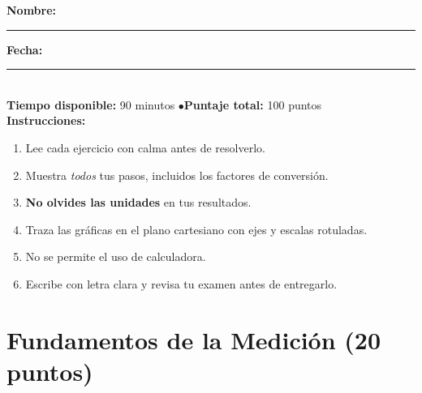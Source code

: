 \documentclass[12pt, letterpaper]{article}
\begin{document}


\vspace{4pt}
\begin{cuadroinfo}
  \small
  \textbf{Nombre:} \rule{0.55\linewidth}{0.4pt} \quad \textbf{Fecha:} \rule{0.15\linewidth}{0.4pt} \\[6pt]
  \textbf{Tiempo disponible:} 90 minutos \quad$\bullet$\quad \textbf{Puntaje total:} 100 puntos \\[4pt]
  \textbf{Instrucciones:}
  \begin{enumerate}[leftmargin=*]
    \item Lee cada ejercicio con calma antes de resolverlo.
    \item Muestra \emph{todos} tus pasos, incluidos los factores de conversión.
    \item \textbf{No olvides las unidades} en tus resultados.
    \item Traza las gráficas en el plano cartesiano con ejes y escalas rotuladas.
    \item No se permite el uso de calculadora.
    \item Escribe con letra clara y revisa tu examen antes de entregarlo.
  \end{enumerate}
\end{cuadroinfo}

\vspace{8pt}

\section{Fundamentos de la Medición (20 puntos)}
\end{document}
